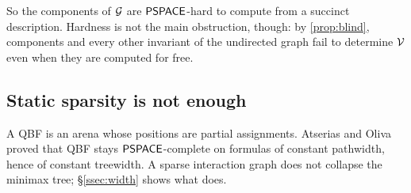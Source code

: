 So the components of $\mathcal{G}$ are $\mathsf{PSPACE}$-hard to compute from a succinct description. Hardness is not the main obstruction, though: by \cref{prop:blind}, components and every other invariant of the undirected graph fail to determine $\mathcal{V}$ even when they are computed for free.

\subsection{Static sparsity is not enough}
A QBF is an arena whose positions are partial assignments. Atserias and Oliva \cite{AtseriasOliva} proved that QBF stays $\mathsf{PSPACE}$-complete on formulas of constant pathwidth, hence of constant treewidth. A sparse interaction graph does not collapse the minimax tree; \S\ref{ssec:width} shows what does.
